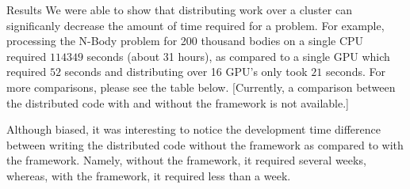 \begin{block}{\Large Results}
We were able to show that distributing work over a cluster can
significanly decrease the amount of time required for a problem. For example,
processing the N-Body problem for 200 thousand bodies on a single CPU required
$114349$ seconds (about 31 hours), as compared to a single GPU which required
$52$ seconds and distributing over 16 GPU's only took $21$ seconds. For more
comparisons, please see the table below. [Currently, a comparison between the
distributed code with and without the framework is not available.]\hfill{}\\{}

Although biased, it was interesting to notice the development time difference
between writing the distributed code without the framework as compared to with
the framework. Namely, without the framework, it required several weeks,
whereas, with the framework, it required less than a week.
\end{block}
